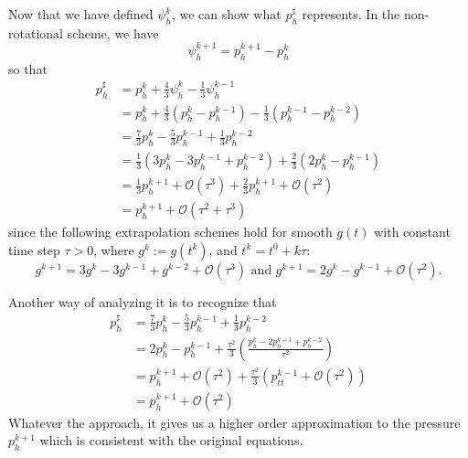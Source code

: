 \documentclass[letterpaper]{erdc}
\begin{document}
\begin{remark}
Now that we have defined $\psi_h^{k}$, we can show what $p_h^{\sharp}$ represents.  In the non-rotational scheme, we have
\begin{equation}
  \psi_h^{k+1} = p_h^{k+1} - p_h^{k}
\end{equation}
so that
  \begin{align}
    p_h^{\sharp} &= p_h^{k} + \frac{4}{3}\psi_h^{k} - \frac{1}{3}\psi_h^{k-1}\\
    &= p_h^{k} + \frac{4}{3}\left(p_h^{k} - p_h^{k-1}\right) - \frac{1}{3}\left(p_h^{k-1} - p_h^{k-2}\right)\\
    &= \frac{7}{3}p_h^{k} - \frac{5}{3}p_h^{k-1}+ \frac{1}{3}p_h^{k-2} \\
    &= \frac{1}{3}\left( 3p_h^{k} - 3p_h^{k-1} + p_h^{k-2} \right) + \frac{2}{3}\left(2p_h^{k} - p_h^{k-1}  \right)\\
    &= \frac{1}{3}p_h^{k+1} + \mathcal{O}(\tau^{3}) + \frac{2}{3} p_h^{k+1} + \mathcal{O}(\tau^{2})\\
    &= p_h^{k+1} + \mathcal{O}\left(\tau^2+\tau^3\right)
  \end{align}
  since the following extrapolation schemes hold for smooth $g(t)$ with constant time step $\tau>0$, where $g^{k} := g\left(t^{k}\right)$, and $t^k = t^0+k\tau$:
  \begin{equation}
    g^{k+1} = 3g^k - 3g^{k-1}+g^{k-2} + \mathcal{O}(\tau^3) \mbox{ and } g^{k+1}=2g^{k} - g^{k-1}+\mathcal{O}(\tau^2).
  \end{equation}
  
  Another way of analyzing it is to recognize that 
  \begin{align}
    p^{\sharp}_h &= \frac{7}{3}p_h^{k} - \frac{5}{3}p_h^{k-1}+ \frac{1}{3}p_h^{k-2} \\
    &= 2p_h^k - p_h^{k-1} + \frac{\tau^2}{3}\left(\frac{p_h^{k} - 2p^{k-1}_h + p_h^{k-2}}{\tau^2}  \right)\\
    &= p_h^{k+1} + \mathcal{O}(\tau^{2}) + \frac{\tau^2}{3}\left( p_{tt}^{k-1} + \mathcal{O}(\tau^{2}) \right)\\
    &= p_h^{k+1} + \mathcal{O}(\tau^2)
  \end{align}
  Whatever the approach, it gives us a higher order approximation to the pressure $p_h^{k+1}$ which is consistent with the original equations.
  

\end{remark}
\end{document}
